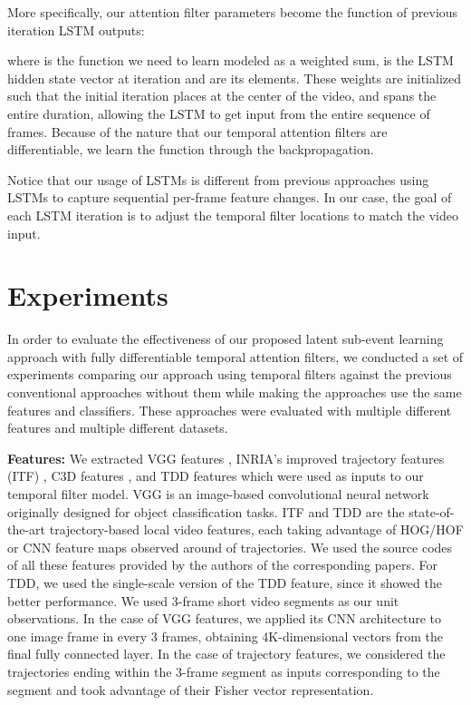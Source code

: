 \documentclass[letterpaper]{article}
\begin{document}
More specifically, our attention filter parameters become the function of previous iteration LSTM outputs:

where  is the function we need to learn modeled as a weighted sum,  is the LSTM hidden state vector at iteration  and  are its elements. These weights are initialized such that the initial iteration places  at the center of the video, and  spans the entire duration, allowing the LSTM to get input from the entire sequence of frames. Because of the nature that our temporal attention filters are differentiable, we learn the function  through the backpropagation.

Notice that our usage of LSTMs is different from previous approaches \cite{google15} using LSTMs to capture sequential per-frame feature changes. In our case, the goal of each LSTM iteration is to adjust the temporal filter locations to match the video input.



\section{Experiments}

In order to evaluate the effectiveness of our proposed latent sub-event learning approach with fully differentiable temporal attention filters, we conducted a set of experiments comparing our approach using temporal filters against the previous conventional approaches without them while making the approaches use the same features and classifiers. These approaches were evaluated with multiple different features and multiple different datasets.

{\flushleft\textbf{Features:} We extracted VGG features \cite{vgg}, INRIA's improved trajectory features (ITF) \cite{wang13}, C3D features \cite{c3d}, and TDD features \cite{tdd15} which were used as inputs to our temporal filter model. VGG is an image-based convolutional neural network originally designed for object classification tasks. ITF and TDD are the state-of-the-art trajectory-based local video features, each taking advantage of HOG/HOF or CNN feature maps observed around of trajectories. We used the source codes of all these features provided by the authors of the corresponding papers. For TDD, we used the single-scale version of the TDD feature, since it showed the better performance. We used 3-frame short video segments as our unit observations. In the case of VGG features, we applied its CNN architecture to one image frame in every 3 frames, obtaining 4K-dimensional vectors from the final fully connected layer. In the case of trajectory features, we considered the trajectories ending within the 3-frame segment as inputs corresponding to the segment and took advantage of their Fisher vector representation.}
\end{document}
